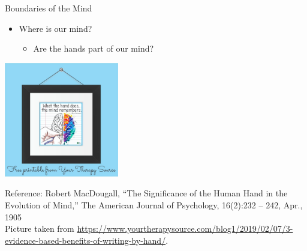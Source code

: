 \documentclass{beamer}
\begin{document}
\begin{frame}
{\centerline{Boundaries of the Mind}}

\begin{center}
\begin{itemize}
    \item Where is our mind?
    \begin{itemize}
    \item Are the hands part of our mind?
\end{itemize} 
\end{itemize} 

 \includegraphics[width=5cm]{P2023.AIBCCSS.ExtendedMindDistributedCognitionSystemicThinking/what-the-hand-does-the-mind-remembers.jpg}
 
 \end{center}

\begin{center}
\tiny
Reference: Robert MacDougall, ``The Significance of the Human Hand in the Evolution of Mind,'' The American Journal of Psychology, 16(2):232 -- 242, Apr., 1905\\Picture taken from \url{https://www.yourtherapysource.com/blog1/2019/02/07/3-evidence-based-benefits-of-writing-by-hand/}.
\end{center}
\end{frame}
\end{document}
